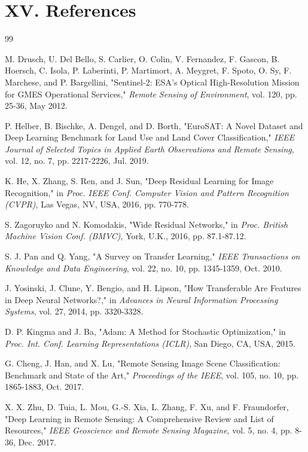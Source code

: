 ﻿\documentclass[conference]{IEEEtran}
\begin{document}
\section*{XV. References}
\begin{thebibliography}{99}

M. Drusch, U. Del Bello, S. Carlier, O. Colin, V. Fernandez, F. Gascon, B. Hoersch, C. Isola, P. Laberinti, P. Martimort, A. Meygret, F. Spoto, O. Sy, F. Marchese, and P. Bargellini, "Sentinel-2: ESA's Optical High-Resolution Mission for GMES Operational Services," \emph{Remote Sensing of Environment}, vol. 120, pp. 25-36, May 2012.

P. Helber, B. Bischke, A. Dengel, and D. Borth, "EuroSAT: A Novel Dataset and Deep Learning Benchmark for Land Use and Land Cover Classification," \emph{IEEE Journal of Selected Topics in Applied Earth Observations and Remote Sensing}, vol. 12, no. 7, pp. 2217-2226, Jul. 2019.

K. He, X. Zhang, S. Ren, and J. Sun, "Deep Residual Learning for Image Recognition," in \emph{Proc. IEEE Conf. Computer Vision and Pattern Recognition (CVPR)}, Las Vegas, NV, USA, 2016, pp. 770-778.

S. Zagoruyko and N. Komodakis, "Wide Residual Networks," in \emph{Proc. British Machine Vision Conf. (BMVC)}, York, U.K., 2016, pp. 87.1-87.12.

S. J. Pan and Q. Yang, "A Survey on Transfer Learning," \emph{IEEE Transactions on Knowledge and Data Engineering}, vol. 22, no. 10, pp. 1345-1359, Oct. 2010.

J. Yosinski, J. Clune, Y. Bengio, and H. Lipson, "How Transferable Are Features in Deep Neural Networks?," in \emph{Advances in Neural Information Processing Systems}, vol. 27, 2014, pp. 3320-3328.

D. P. Kingma and J. Ba, "Adam: A Method for Stochastic Optimization," in \emph{Proc. Int. Conf. Learning Representations (ICLR)}, San Diego, CA, USA, 2015.

G. Cheng, J. Han, and X. Lu, "Remote Sensing Image Scene Classification: Benchmark and State of the Art," \emph{Proceedings of the IEEE}, vol. 105, no. 10, pp. 1865-1883, Oct. 2017.

X. X. Zhu, D. Tuia, L. Mou, G.-S. Xia, L. Zhang, F. Xu, and F. Fraundorfer, "Deep Learning in Remote Sensing: A Comprehensive Review and List of Resources," \emph{IEEE Geoscience and Remote Sensing Magazine}, vol. 5, no. 4, pp. 8-36, Dec. 2017.


\end{thebibliography}
\end{document}
